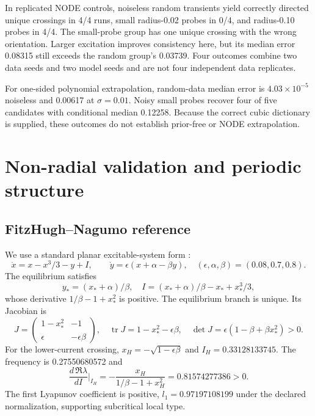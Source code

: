 \documentclass[11pt,a4paper]{article}
\newcommand{\tr}{\operatorname{tr}}
\begin{document}
In replicated NODE controls, noiseless random transients yield correctly directed unique crossings in 4/4 runs, small radius-0.02 probes in 0/4, and radius-0.10 probes in 4/4. The small-probe group has one unique crossing with the wrong orientation. Larger excitation improves consistency here, but its median error 0.08315 still exceeds the random group's 0.03739. Four outcomes combine two data seeds and two model seeds and are not four independent data replicates.

For one-sided polynomial extrapolation, random-data median error is $4.03\times10^{-5}$ noiseless and 0.00617 at $\sigma=0.01$. Noisy small probes recover four of five candidates with conditional median 0.12258. Because the correct cubic dictionary is supplied, these outcomes do not establish prior-free or NODE extrapolation.

\section{Non-radial validation and periodic structure}
\subsection{FitzHugh--Nagumo reference}
We use a standard planar excitable-system form \cite{fitzhugh,nagumo}:
\begin{equation}
\dot x=x-x^3/3-y+I,\qquad \dot y=\epsilon(x+\alpha-\beta y),
\quad(\epsilon,\alpha,\beta)=(0.08,0.7,0.8).
\end{equation}
The equilibrium satisfies
\begin{equation}
y_*=(x_*+\alpha)/\beta,\quad
I=(x_*+\alpha)/\beta-x_*+x_*^3/3,
\end{equation}
whose derivative $1/\beta-1+x_*^2$ is positive. The equilibrium branch is unique. Its Jacobian is
\begin{equation}
J=\begin{pmatrix}1-x_*^2&-1\\ \epsilon&-\epsilon\beta\end{pmatrix},
\quad \tr J=1-x_*^2-\epsilon\beta,\quad
\det J=\epsilon(1-\beta+\beta x_*^2)>0.
\end{equation}
For the lower-current crossing,
$x_H=-\sqrt{1-\epsilon\beta}$ and $I_H=0.33128133745$.
The frequency is 0.27550680572 and
\begin{equation}
\frac{d\,\Re\lambda}{dI}\bigg|_{I_H}
=-\frac{x_H}{1/\beta-1+x_H^2}=0.81574277386>0.
\end{equation}
The first Lyapunov coefficient is positive, $l_1=0.97197108199$ under the declared normalization, supporting subcritical local type.
\end{document}
